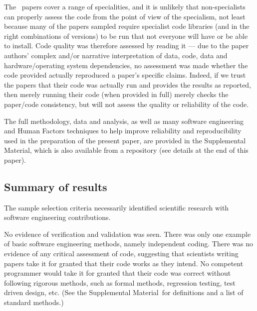 \documentclass[10pt,letterpaper]{article}
\def\supplement{Supplemental Material}
\begin{document}
The \the\dataN\ papers cover a range of specialities, and it is unlikely that non-specialists can properly assess the code from the point of view of the specialism, not least because many of the papers sampled require specialist code libraries (and in the right combinations of versions) to be run that not everyone will have or be able to install. Code quality was therefore assessed by reading it --- due to the paper authors' complex and/or narrative interpretation of data, code, data and hardware/operating system dependencies, no assessment was made whether the code provided actually reproduced a paper's specific claims. Indeed, if we trust the papers that their code was actually run and provides the results as reported, then merely running their code (when provided in full) merely checks the paper/code consistency, but will not assess the quality or reliability of the code.


The full methodology, data and analysis, as well as many software engineering and Human Factors techniques to help improve reliability and reproducibility used in the preparation of the present paper, are provided in the \supplement, which is also available from a repository (see details at the end of this paper).


\subsection{Summary of results}
The sample selection criteria necessarily identified scientific research with software engineering contributions. 

No evidence of verification and validation was seen. There was only one example of basic software engineering methods, namely independent coding. There was no evidence of any critical assessment of code, suggesting that scientists writing papers take it for granted that their code works as they intend. No competent programmer would take it for granted that their code was correct without following rigorous methods, such as formal methods, regression testing, test driven design, etc. (See the \supplement\ for definitions and a list of standard methods.)
\end{document}
